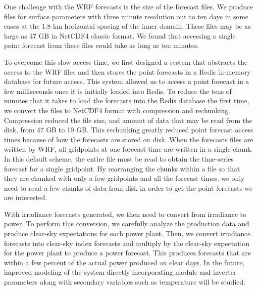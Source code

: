 One challenge with the WRF forecasts is the size of the forecast
files.
We produce files for surface parameters with three minute resolution
out to ten days in some cases at the 1.8 km horizontal spacing of the
inner domain.
These files may be as large as 47 GB in NetCDF4 classic format.
We found that accessing a single point forecast from these files could
take as long as ten minutes.

To overcome this slow access time, we first designed a system that
abstracts the access to the WRF files and then stores the point
forecasts in a Redis in-memory database for future access.
This system allowed us to access a point forecast in a few
milliseconds once it is initially loaded into Redis.
To reduce the tens of minutes that it takes to load the forecasts into
the Redis database the first time, we convert the files to NetCDF4
format with compression and rechunking.
Compression reduced the file size, and amount of data that may be read
from the disk, from 47 GB to 19 GB.
This rechunking greatly reduced point forecast access times because of
how the forecasts are stored on disk.
When the forecasts files are written by WRF, all gridpoints at one
forecast time are written in a single chunk.
In this default scheme, the entire file must be read to obtain the
time-series forecast for a single gridpoint.
By rearranging the chunks within a file so that they are chunked with
only a few gridpoints and all the forecast times, we
only need to read a few chunks of data from disk in order to get the
point forecasts we are interested.

With irradiance forecasts generated, we then need to convert from
irradiance to power.
To perform this conversion, we carefully analyze the
production data and produce clear-sky expectations for each power
plant.
Then, we convert irradiance forecasts into clear-sky index forecasts
and multiply by the clear-sky expectation for the power plant to
produce a power forecast.
This produces forecasts that are within a few percent of the actual
power produced on clear days.
In the future, improved modeling of the system directly incorporating
module and inverter parameters along with secondary variables such as
temperature will be studied.

